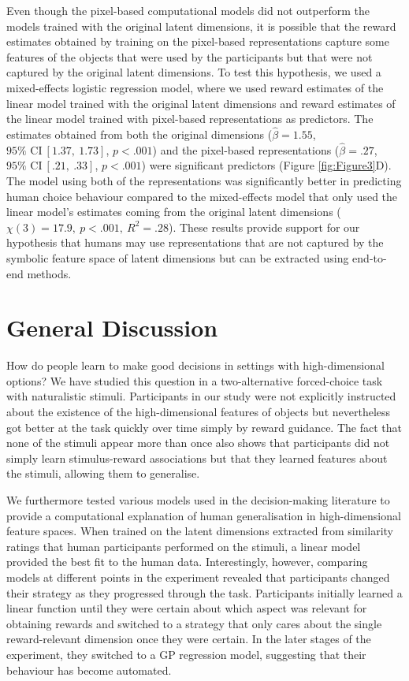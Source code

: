 \documentclass[10pt]{article}
\begin{document}
Even though the pixel-based computational models did not outperform the models trained with the original latent dimensions, it is possible that the reward estimates obtained by training on the pixel-based representations capture some features of the objects that were used by the participants but that were not captured by the original latent dimensions. To test this hypothesis, we used a  mixed-effects logistic regression model, where we used reward estimates of the linear model trained with the original latent dimensions and reward estimates of the linear model trained with pixel-based representations as predictors. The estimates obtained from both the original dimensions ($\hat{\beta} = 1.55$, $95 \% \text{ CI} \:[1.37, \: 1.73]$, $p < .001$) and the pixel-based representations ($\hat{\beta} = .27$, $95 \% \text{ CI} \: [.21, \: .33]$, $p < .001$) were significant predictors (Figure \ref{fig:Figure3}D). The model using both of the representations was significantly better in predicting human choice behaviour compared to the mixed-effects model that only used the linear model's estimates coming from the original latent dimensions ($\chi(3) = 17.9, \: p<.001, \: R^2 = .28$). These results provide support for our hypothesis that humans may use representations that are not captured by the symbolic feature space of latent dimensions but can be extracted using end-to-end methods.  

\section{General Discussion}

How do people learn to make good decisions in settings with high-dimensional options? We have studied this question in a two-alternative forced-choice task with naturalistic stimuli. Participants in our study were not explicitly instructed about the existence of the high-dimensional features of objects but nevertheless got better at the task quickly over time simply by reward guidance. The fact that none of the stimuli appear more than once also shows that participants did not simply learn stimulus-reward associations but that they learned features about the stimuli, allowing them to generalise.

We furthermore tested various models used in the decision-making literature to provide a computational explanation of human generalisation in high-dimensional feature spaces. When trained on the latent dimensions extracted from similarity ratings that human participants performed on the stimuli, a linear model provided the best fit to the human data. Interestingly, however, comparing models at different points in the experiment revealed that participants changed their strategy as they progressed through the task. Participants initially learned a linear function until they were certain about which aspect was relevant for obtaining rewards and switched to a strategy that only cares about the single reward-relevant dimension once they were certain. In the later stages of the experiment, they switched to a GP regression model, suggesting that their behaviour has become automated.
\end{document}
